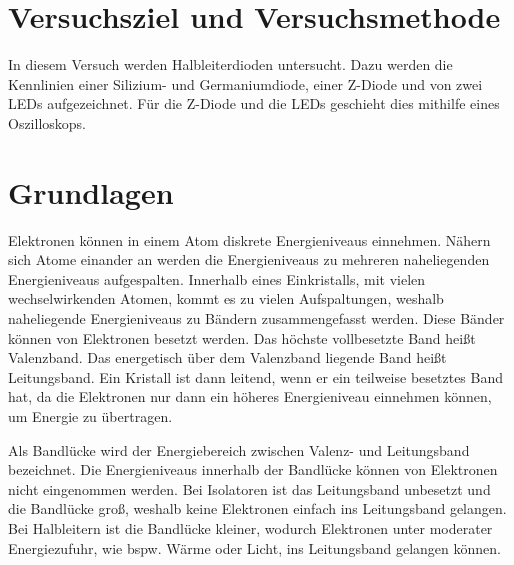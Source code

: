 \documentclass[
12pt,
a4paper,
bibliography=totocnumbered, %
BCOR=1cm, %
oneside, %
]{scrartcl}
\begin{document}
\thispagestyle{empty}



\thispagestyle{empty}

\tableofcontents

\clearpage %

\renewcommand{\thepage}{\arabic{page}}
\setcounter{page}{1}


\section[Versuchsziel]{Versuchsziel und Versuchsmethode}

In diesem Versuch werden Halbleiterdioden untersucht. Dazu werden die Kennlinien einer Silizium- und Germaniumdiode, einer Z-Diode und von zwei LEDs aufgezeichnet. Für die Z-Diode und die LEDs geschieht dies mithilfe eines Oszilloskops.

\section{Grundlagen}

Elektronen können in einem Atom diskrete Energieniveaus einnehmen. Nähern sich Atome einander an werden die Energieniveaus zu mehreren naheliegenden Energieniveaus aufgespalten. Innerhalb eines Einkristalls, mit vielen wechselwirkenden Atomen, kommt es zu vielen Aufspaltungen, weshalb naheliegende Energieniveaus zu Bändern zusammengefasst werden. Diese Bänder können von Elektronen besetzt werden. Das höchste vollbesetzte Band heißt Valenzband. Das energetisch über dem Valenzband liegende Band heißt Leitungsband. Ein Kristall ist dann leitend, wenn er ein teilweise besetztes Band hat, da die Elektronen nur dann ein höheres Energieniveau einnehmen können, um Energie zu übertragen.

Als Bandlücke wird der Energiebereich zwischen Valenz- und Leitungsband bezeichnet. Die Energieniveaus innerhalb der Bandlücke können von Elektronen nicht eingenommen werden. Bei Isolatoren ist das Leitungsband unbesetzt und die Bandlücke groß, weshalb keine Elektronen einfach ins Leitungsband gelangen. Bei Halbleitern ist die Bandlücke kleiner, wodurch Elektronen unter moderater Energiezufuhr, wie bspw. Wärme oder Licht, ins Leitungsband gelangen können.
\end{document}
